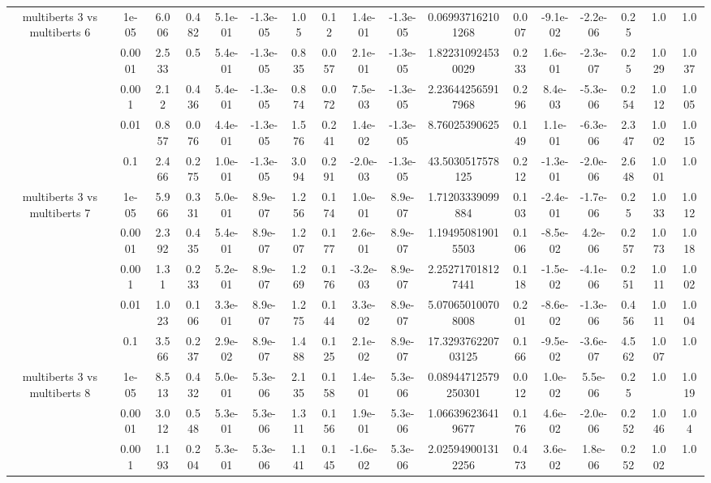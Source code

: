 \begin{tabular}{|c|c|c|c|c|c|c|c|c|c|c|c|c|c|c|c|c|}
\hline
\multirow{5}{*}{multiberts 3 vs multiberts 6} & 1e-05 & 6.006 & 0.482 & 5.1e-01 & -1.3e-05 & 1.05 & 0.12 & 1.4e-01 & -1.3e-05 & 0.069937162101268 & 0.007 & -9.1e-02 & -2.2e-06 & 0.25 & 1.0 & 1.0 \\
 & 0.0001 & 2.533 & 0.5 & 5.4e-01 & -1.3e-05 & 0.835 & 0.057 & 2.1e-01 & -1.3e-05 & 1.822310924530029 & 0.233 & 1.6e-01 & -2.3e-07 & 0.25 & 1.029 & 1.037 \\
 & 0.001 & 2.12 & 0.436 & 5.4e-01 & -1.3e-05 & 0.874 & 0.072 & 7.5e-03 & -1.3e-05 & 2.236442565917968 & 0.296 & 8.4e-03 & -5.3e-06 & 0.254 & 1.012 & 1.005 \\
 & 0.01 & 0.857 & 0.076 & 4.4e-01 & -1.3e-05 & 1.576 & 0.241 & 1.4e-02 & -1.3e-05 & 8.76025390625 & 0.149 & 1.1e-01 & -6.3e-06 & 2.347 & 1.002 & 1.015 \\
 & 0.1 & 2.466 & 0.275 & 1.0e-01 & -1.3e-05 & 3.094 & 0.291 & -2.0e-03 & -1.3e-05 & 43.5030517578125 & 0.212 & -1.3e-01 & -2.0e-06 & 2.648 & 1.001 & 1.0 \\
\hline
\multirow{5}{*}{multiberts 3 vs multiberts 7} & 1e-05 & 5.966 & 0.331 & 5.0e-01 & 8.9e-07 & 1.256 & 0.174 & 1.0e-01 & 8.9e-07 & 1.71203339099884 & 0.103 & -2.4e-01 & -1.7e-06 & 0.25 & 1.033 & 1.012 \\
 & 0.0001 & 2.392 & 0.435 & 5.4e-01 & 8.9e-07 & 1.207 & 0.177 & 2.6e-01 & 8.9e-07 & 1.194950819015503 & 0.106 & -8.5e-02 & 4.2e-06 & 0.257 & 1.073 & 1.018 \\
 & 0.001 & 1.31 & 0.233 & 5.2e-01 & 8.9e-07 & 1.269 & 0.176 & -3.2e-03 & 8.9e-07 & 2.252717018127441 & 0.118 & -1.5e-02 & -4.1e-06 & 0.251 & 1.011 & 1.002 \\
 & 0.01 & 1.023 & 0.106 & 3.3e-01 & 8.9e-07 & 1.275 & 0.144 & 3.3e-02 & 8.9e-07 & 5.070650100708008 & 0.201 & -8.6e-02 & -1.3e-06 & 0.456 & 1.011 & 1.004 \\
 & 0.1 & 3.566 & 0.237 & 2.9e-02 & 8.9e-07 & 1.488 & 0.125 & 2.1e-02 & 8.9e-07 & 17.329376220703125 & 0.166 & -9.5e-02 & -3.6e-07 & 4.562 & 1.007 & 1.0 \\
\hline
\multirow{5}{*}{multiberts 3 vs multiberts 8} & 1e-05 & 8.513 & 0.432 & 5.0e-01 & 5.3e-06 & 2.135 & 0.158 & 1.4e-01 & 5.3e-06 & 0.08944712579250301 & 0.012 & 1.0e-02 & 5.5e-06 & 0.25 & 1.0 & 1.019 \\
 & 0.0001 & 3.012 & 0.548 & 5.3e-01 & 5.3e-06 & 1.311 & 0.156 & 1.9e-01 & 5.3e-06 & 1.066396236419677 & 0.176 & 4.6e-02 & -2.0e-06 & 0.252 & 1.046 & 1.04 \\
 & 0.001 & 1.193 & 0.204 & 5.3e-01 & 5.3e-06 & 1.141 & 0.145 & -1.6e-02 & 5.3e-06 & 2.025949001312256 & 0.473 & 3.6e-02 & 1.8e-06 & 0.252 & 1.002 & 1.0 \\

\end{tabular}
